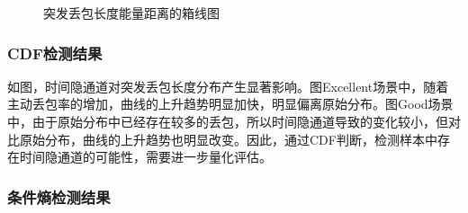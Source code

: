 {	\begin{figure}
        \centering
        \caption{突发丢包长度能量距离的箱线图}
        \label{fig:3:result:burst:ed}
	\end{figure}
}

\subsubsection{CDF检测结果}
\label{chap:analyze:result:burst:cdf}

如图，时间隐通道对突发丢包长度分布产生显著影响。图Excellent场景中，随着主动丢包率的增加，曲线的上升趋势明显加快，明显偏离原始分布。图Good场景中，由于原始分布中已经存在较多的丢包，所以时间隐通道导致的变化较小，但对比原始分布，曲线的上升趋势也明显改变。因此，通过CDF判断，检测样本中存在时间隐通道的可能性，需要进一步量化评估。

\subsubsection{条件熵检测结果}
\label{chap:analyze:result:burst:kld}

